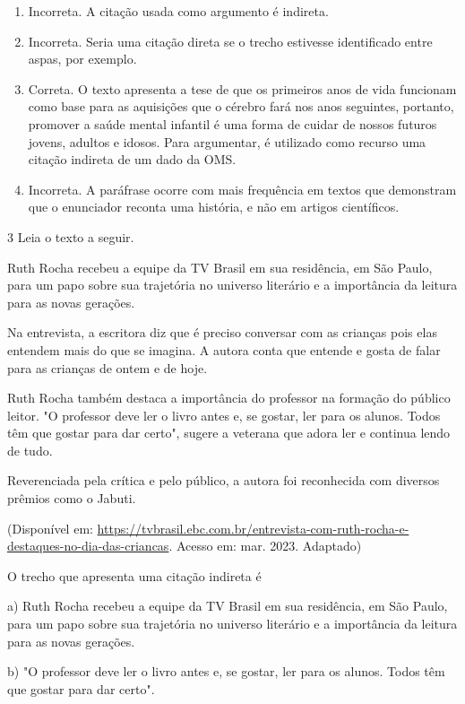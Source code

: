 \begin{enumerate}
\def\labelenumi{\alph{enumi})}
\item Incorreta. A citação usada como argumento é indireta.
\item Incorreta. Seria uma citação direta se o trecho estivesse
identificado entre aspas, por exemplo.
\item Correta. O texto apresenta a tese de que os primeiros anos de vida
funcionam como base para as aquisições que o cérebro fará nos anos
seguintes, portanto, promover a saúde mental infantil é uma forma de
cuidar de nossos futuros jovens, adultos e idosos. Para argumentar, é
utilizado como recurso uma citação indireta de um dado da OMS.
\item Incorreta. A paráfrase ocorre com mais frequência em textos que
demonstram que o enunciador reconta uma história, e não em artigos
científicos.
\end{enumerate}

\num{3} Leia o texto a seguir.

Ruth Rocha recebeu a equipe da TV Brasil em sua residência, em São
Paulo, para um papo sobre sua trajetória no universo literário e a
importância da leitura para as novas gerações.

Na entrevista, a escritora diz que é preciso conversar com as crianças
pois elas entendem mais do que se imagina. A autora conta que entende e
gosta de falar para as crianças de ontem e de hoje.

Ruth Rocha também destaca a importância do professor na formação do
público leitor. "O professor deve ler o livro antes e, se gostar, ler
para os alunos. Todos têm que gostar para dar certo", sugere a veterana
que adora ler e continua lendo de tudo.

Reverenciada pela crítica e pelo público, a autora foi reconhecida com
diversos prêmios como o Jabuti.

(Disponível em: 
\url{https://tvbrasil.ebc.com.br/entrevista-com-ruth-rocha-e-destaques-no-dia-das-criancas}.
Acesso em: mar. 2023. Adaptado)

O trecho que apresenta uma citação indireta é

a) Ruth Rocha recebeu a equipe da TV Brasil em sua residência, em São
Paulo, para um papo sobre sua trajetória no universo literário e a
importância da leitura para as novas gerações.

b) "O professor deve ler o livro antes e, se gostar, ler para os alunos.
Todos têm que gostar para dar certo".

